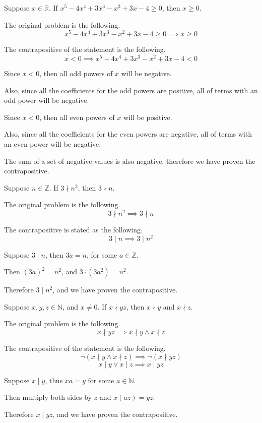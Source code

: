 \documentclass[openany, 12pt]{book}
\begin{document}
\begin{exercise}{}{}
	Suppose $x \in \mathbb{R}$. If $x^5 - 4x^4 + 3x^3 - x^2 +
		3x -4 \geq 0$, then $x \geq 0$.
	\begin{alist}
		\item The original problem is the following.
		$$x^5 - 4x^4 + 3x^3 - x^2 + 3x -4 \geq 0 \implies x \geq 0$$
		\item The contrapositive of the statement is the following.
		$$ x < 0 \implies x^5 - 4x^4 + 3x^3 - x^2 + 3x -4 < 0 $$
		\item Since $ x<0$, then all odd powers of $x$ will be negative.
		\item Also, since all the coefficients for the odd powers are positive, all
		of terms with an odd power will be negative.
		\item Since $ x<0$, then all even powers of $x$ will be positive.
		\item Also, since all the coefficients for the even powers are negative, all
		of terms with an even power will be negative.
		\item The sum of a set of negative values is also negative, therefore we
		have proven the contrapositive.
	\end{alist}
\end{exercise}

\begin{exercise}{}{}
	Suppose $n \in \mathbb{Z}$. If $3 \nmid n^2$, then $3 \nmid n$.
	\begin{alist}
		\item The original problem is the following.
		$$3 \nmid n^2 \implies 3 \nmid n$$
		\item The contrapositive is stated as the following.
		$$3 \mid n \implies 3 \mid n^2$$
		\item Suppose $3 \mid n$, then $3a=n$, for some $a \in \mathbb{Z}$.
		\item Then $(3a)^2=n^2$, and $3 \cdot (3a^2) = n^2$.
		\item Therefore $3 \mid n^2$, and we have proven the contrapositive.
	\end{alist}
\end{exercise}

\begin{exercise}{}{}
	Suppose $x,y,z \in \mathbb{N}$, and $x\neq0$. If $x
		\nmid yz$, then $x\nmid y$ and $x \nmid z$.
	\begin{alist}
		\item The original problem is the following.
		$$ x \nmid yz \implies x\nmid y \land x \nmid z$$
		\item The contrapositive of the statement is the following.
		$$
			\neg(x\nmid y \land x \nmid z)
			\implies
			\neg(x \nmid yz)
		$$
		$$
			x\mid y \lor x \mid z
			\implies
			x \mid yz
		$$
		\item Suppose $x \mid y$, thus $xa = y$ for some $a \in \mathbb{N}$.
		\item Then multiply both sides by $z$ and $x(az) = yz$.
		\item Therefore $x \mid yz$, and we have proven the contrapositive.
	\end{alist}
\end{exercise}
\end{document}
